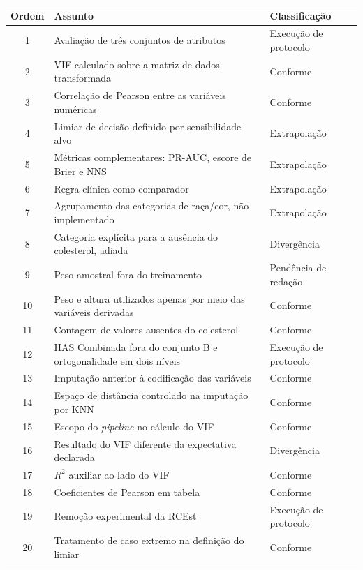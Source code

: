 \begin{quadro}[H]
  \caption{\label{qua:decisoes-1}Índice das decisões de implementação, parte 1 de 3.}
  \small
  \begin{tabular}{|c|p{9.2cm}|p{4.2cm}|}
    \hline
    \textbf{Ordem} & \textbf{Assunto} & \textbf{Classificação} \\ \hline
    1 & Avaliação de três conjuntos de atributos & Execução de protocolo \\ \hline
    2 & VIF calculado sobre a matriz de dados transformada & Conforme \\ \hline
    3 & Correlação de Pearson entre as variáveis numéricas & Conforme \\ \hline
    4 & Limiar de decisão definido por sensibilidade-alvo & Extrapolação \\ \hline
    5 & Métricas complementares: PR-AUC, escore de Brier e NNS & Extrapolação \\ \hline
    6 & Regra clínica como comparador & Extrapolação \\ \hline
    7 & Agrupamento das categorias de raça/cor, não implementado & Extrapolação \\ \hline
    8 & Categoria explícita para a ausência do colesterol, adiada & Divergência \\ \hline
    9 & Peso amostral fora do treinamento & Pendência de redação \\ \hline
    10 & Peso e altura utilizados apenas por meio das variáveis derivadas & Conforme \\ \hline
    11 & Contagem de valores ausentes do colesterol & Conforme \\ \hline
    12 & HAS Combinada fora do conjunto B e ortogonalidade em dois níveis & Execução de protocolo \\ \hline
    13 & Imputação anterior à codificação das variáveis & Conforme \\ \hline
    14 & Espaço de distância controlado na imputação por KNN & Conforme \\ \hline
    15 & Escopo do \textit{pipeline} no cálculo do VIF & Conforme \\ \hline
    16 & Resultado do VIF diferente da expectativa declarada & Divergência \\ \hline
    17 & $R^2$ auxiliar ao lado do VIF & Conforme \\ \hline
    18 & Coeficientes de Pearson em tabela & Conforme \\ \hline
    19 & Remoção experimental da RCEst & Execução de protocolo \\ \hline
    20 & Tratamento de caso extremo na definição do limiar & Conforme \\ \hline
  \end{tabular}
\end{quadro}

